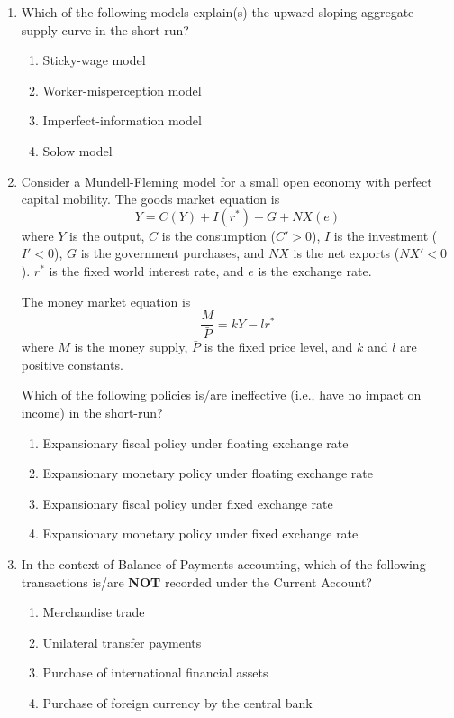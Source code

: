 \documentclass[journal,13pt,onecolumn]{exam}
\theoremstyle{remark}
\begin{document}
\begin{enumerate}[label=Q.\arabic*]
\item Which of the following models explain(s) the upward-sloping aggregate supply curve in the short-run?

\begin{enumerate}[label=(\Alph*)]
    \item Sticky-wage model
    \item Worker-misperception model
    \item Imperfect-information model
    \item Solow model
\end{enumerate}
\newpage
\item Consider a Mundell-Fleming model for a small open economy with perfect capital mobility. The goods market equation is
\[
Y = C(Y) + I(r^*) + G + NX(e)
\]
where \( Y \) is the output, \( C \) is the consumption (\( C' > 0 \)), \( I \) is the investment (\( I' < 0 \)), \( G \) is the government purchases, and \( NX \) is the net exports (\( NX' < 0 \)). \( r^* \) is the fixed world interest rate, and \( e \) is the exchange rate.

\vspace{0.3cm}
The money market equation is
\[
\frac{M}{\bar{P}} = kY - l r^*
\]
where \( M \) is the money supply, \( \bar{P} \) is the fixed price level, and \( k \) and \( l \) are positive constants.

\vspace{0.3cm}
Which of the following policies is/are ineffective (i.e., have no impact on income) in the short-run?

\begin{enumerate}[label=(\Alph*)]
    \item Expansionary fiscal policy under floating exchange rate
    \item Expansionary monetary policy under floating exchange rate
    \item Expansionary fiscal policy under fixed exchange rate
    \item Expansionary monetary policy under fixed exchange rate
\end{enumerate}
\item In the context of Balance of Payments accounting, which of the following transactions is/are \textbf{NOT} recorded under the Current Account?

\begin{enumerate}[label=(\Alph*)]
    \item Merchandise trade
    \item Unilateral transfer payments
    \item Purchase of international financial assets
    \item Purchase of foreign currency by the central bank
\end{enumerate}


\end{enumerate}
\end{document}
